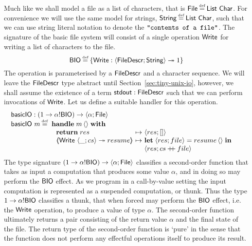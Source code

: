 \documentclass[12pt,phd,lfcs,twoside,openright,logo,leftchapter,normalheadings]{infthesis}
\theoremstyle{plain}
\theoremstyle{definition}
\begin{document}
Much like \UNIX{} we shall model a file as a list of characters, that is
$\UFile \defas \List~\Char$. For convenience we will use the same
model for strings, $\String \defas \List~\Char$, such that we can use
string literal notation to denote the $\texttt{"contents of a file"}$.
%
The signature of the basic file system will consist of a single
operation $\mathsf{Write}$ for writing a list of characters to the file.
%
\[
  \BIO \defas \{\Write : \Record{\UFD;\String} \opto \UnitType\}
\]
%
The operation is parameterised by a $\mathsf{FileDescr}$ and a character
sequence. We will leave the $\mathsf{FileDescr}$ type abstract until
Section~\ref{sec:tiny-unix-io}, however, we shall assume the existence
of a term $\mathsf{stdout} : \mathsf{FileDescr}$ such that we can perform invocations of
$\mathsf{Write}$.
%
Let us define a suitable handler for this operation.
%
\[
  \bl
    \basicIO : (\UnitType \to \alpha \eff \BIO) \to \Record{\alpha; \UFile}\\
    \basicIO~m \defas
       \ba[t]{@{~}l}
         \Handle\;m\,\Unit\;\With\\
           ~\ba{@{~}l@{~}c@{~}l}
              \Return\;res &\mapsto& \Record{res;\nil}\\
              \OpCase{\Write}{\Record{\_;cs}}{resume} &\mapsto&
                 \ba[t]{@{}l}
                   \Let\; \Record{res;file} = resume\,\Unit\;\In\\
                   \Record{res; cs \concat file}
                 \ea
           \ea
       \ea
  \el
\]
%
The type signature
$(1 \to \alpha ! \mathsf{BIO}) \to \langle \alpha;\mathsf{File} \rangle$
classifies a second-order function that takes as input a computation
that produces some value $\alpha$, and in doing so may perform the
$\mathsf{BIO}$ effect. As we program in a call-by-value setting the input
computation is represented as a suspended computation, or thunk. Thus
the type $1 \to \alpha ! \mathsf{BIO}$ classifies a thunk, that
when forced may perform the $\mathsf{BIO}$ effect, i.e. the $\mathsf{Write}$
operation, to produce a value of type $\alpha$.
%
The second-order function ultimately returns a pair consisting of the
return value $\alpha$ and the final state of the file. The return type
of the second-order function is `pure' in the sense that the function
does not perform any effectful operations itself to produce its
result.
%
\end{document}
